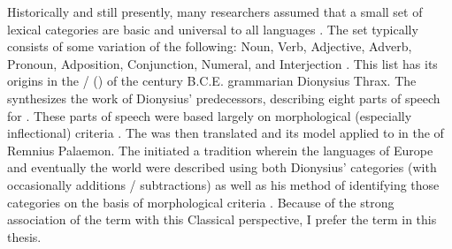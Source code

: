 Historically and still presently, many researchers assumed that a small set of lexical categories are basic and universal to all languages \parencites[81]{BolingerSears1981}[2]{Croft1991}[32]{Payne1997}[95]{Stassen2011}. The set typically consists of some variation of the following: Noun, Verb, Adjective, Adverb, Pronoun, Adposition, Conjunction, Numeral, and Interjection \parencite[16538]{Haspelmath2001}. This list has its origins in the  /  () of the  century B.C.E. grammarian Dionysius Thrax. The  synthesizes the work of Dionysius' predecessors, describing eight parts of speech for . These parts of speech were based largely on morphological (especially inflectional) criteria \parencite[17--20]{Rauh2010}. The  was then translated and its model applied to  in the  of Remnius Palaemon. The  initiated a tradition wherein the languages of Europe and eventually the world  were described using both Dionysius' categories (with occasionally additions / subtractions) as well as his method of identifying those categories on the basis of morphological criteria \parencite[20]{Rauh2010}. Because of the strong association of the term  with this Classical perspective, I prefer the term  in this thesis.


